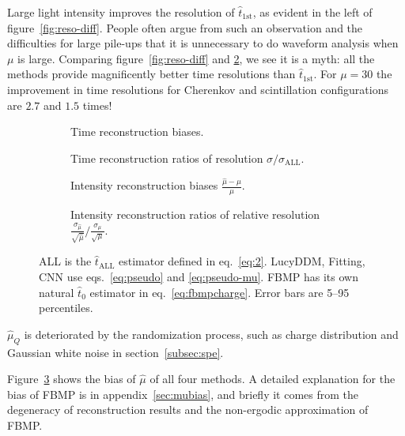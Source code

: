 Large light intensity improves the resolution of $\hat{t}_\mathrm{1st}$, as evident in the left of figure~\ref{fig:reso-diff}.  People often argue from such an observation and the difficulties for large pile-ups that it is unnecessary to do waveform analysis when $\mu$ is large.  Comparing figure~\ref{fig:reso-diff} and \ref{fig:deltamethods}, we see it is a myth: all the methods provide magnificently better time resolutions than $\hat{t}_\mathrm{1st}$. For $\mu=30$ the improvement in time resolutions for Cherenkov and scintillation configurations are $2.7$ and $1.5$ times!

\begin{figure}[H]
  \begin{subfigure}[b]{\textwidth}
    \centering
    \resizebox{\textwidth}{!}{}
    \caption{\label{fig:biasmethods} Time reconstruction biases.}
  \end{subfigure}
  \begin{subfigure}[b]{\textwidth}
    \centering
    \resizebox{\textwidth}{!}{}
    \caption{\label{fig:deltamethods} Time reconstruction ratios of resolution $\sigma/\sigma_{\mathrm{ALL}}$.}
  \end{subfigure}
  \begin{subfigure}[b]{\textwidth}
    \centering
    \resizebox{\textwidth}{!}{}
    \caption{\label{fig:biasmu} Intensity reconstruction biases $\frac{\hat{\mu} - \mu}{\mu}$.}
  \end{subfigure}
  \begin{subfigure}[b]{\textwidth}
    \centering
    \resizebox{\textwidth}{!}{}
    \caption{\label{fig:deltamu} Intensity reconstruction ratios of relative resolution $\frac{\sigma_{\hat{\mu}}}{\sqrt{\hat{\mu}}}/\frac{\sigma_\mu}{\sqrt{\mu}}$. }
  \end{subfigure}
  \caption{ALL is the $\hat{t}_\mathrm{ALL}$ estimator defined in eq.~\eqref{eq:2}. LucyDDM, Fitting, CNN use eqs.~\eqref{eq:pseudo} and \eqref{eq:pseudo-mu}.  FBMP has its own natural $\hat{t}_0$ estimator in eq.~\eqref{eq:fbmpcharge}. Error bars are 5--95 percentiles.}
\end{figure}

$\hat{\mu}_Q$ is deteriorated by the randomization process, such as charge distribution and Gaussian white noise in section~\ref{subsec:spe}. 

Figure~\ref{fig:biasmu} shows the bias of $\hat{\mu}$ of all four methods. A detailed explanation for the bias of FBMP is in appendix~\ref{sec:mubias}, and briefly it comes from the degeneracy of reconstruction results and the non-ergodic approximation of FBMP. 

